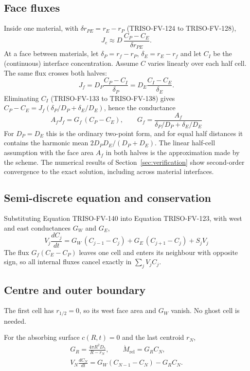 \documentclass[11pt]{article}
\begin{document}
\subsection{Face fluxes}
Inside one material, with $\delta r_{PE}=r_E-r_P$ (TRISO-FV-124 to TRISO-FV-128),
\[
J_e\approx D\,\frac{C_P-C_E}{\delta r_{PE}} .
\]
At a face between materials, let $\delta_P=r_f-r_P$, $\delta_E=r_E-r_f$ and let $C_I$ be the (continuous) interface concentration. Assume $C$ varies linearly over each half cell. The same flux crosses both halves:
\[
J_f=D_P\frac{C_P-C_I}{\delta_P}=D_E\frac{C_I-C_E}{\delta_E}.
\]
Eliminating $C_I$ (TRISO-FV-133 to TRISO-FV-138) gives $C_P-C_E=J_f\left(\delta_P/D_P+\delta_E/D_E\right)$, hence the conductance
\begin{equation}
\boxed{A_fJ_f=G_f\,(C_P-C_E),\qquad G_f=\frac{A_f}{\delta_P/D_P+\delta_E/D_E}}
\tag{TRISO-FV-140}
\end{equation}
For $D_P=D_E$ this is the ordinary two-point form, and for equal half distances it contains the harmonic mean $2D_PD_E/(D_P+D_E)$. The linear half-cell assumption with the face area $A_f$ in both halves is the approximation made by the scheme. The numerical results of Section~\ref{sec:verification} show second-order convergence to the exact solution, including across material interfaces.

\subsection{Semi-discrete equation and conservation}
Substituting Equation TRISO-FV-140 into Equation TRISO-FV-123, with west and east conductances $G_W$ and $G_E$,
\begin{equation}
\boxed{V_j\frac{dC_j}{dt}=G_W\,(C_{j-1}-C_j)+G_E\,(C_{j+1}-C_j)+S_jV_j}
\tag{TRISO-FV-155}
\end{equation}
The flux $G_f(C_E-C_P)$ leaves one cell and enters its neighbour with opposite sign, so all internal fluxes cancel exactly in $\sum_jV_jC_j$.

\subsection{Centre and outer boundary}
The first cell has $r_{1/2}=0$, so its west face area and $G_W$ vanish. No ghost cell is needed.

For the absorbing surface $c(R,t)=0$ and the last centroid $r_N$,
\begin{equation}
\begin{gathered}
G_R=\frac{4\pi R^2D_5}{R-r_N},\qquad \dot M_{\mathrm{rel}}=G_RC_N,\\
V_N\frac{dC_N}{dt}=G_W(C_{N-1}-C_N)-G_RC_N.
\end{gathered}
\tag{TRISO-DEL-030}
\end{equation}
\end{document}
